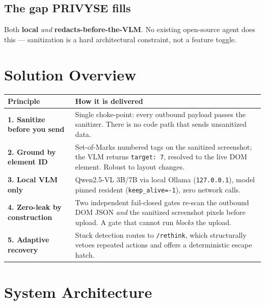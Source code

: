 \documentclass[11pt,a4paper]{article}
\newcommand{\code}[1]{\texttt{#1}}
\begin{document}
\begin{itemize}
\subsection*{The gap PRIVYSE fills}
Both \textbf{local} \emph{and} \textbf{redacts-before-the-VLM}. No existing open-source agent does this --- sanitization is a hard architectural constraint, not a feature toggle.

\section{Solution Overview}

\begin{center}
\begin{tabular}{@{}p{3.2cm}p{9.6cm}@{}}
\toprule
\textbf{Principle} & \textbf{How it is delivered} \\
\midrule
\textbf{1. Sanitize before you send} & Single choke-point: every outbound payload passes the sanitizer. There is no code path that sends unsanitized data. \\
\midrule
\textbf{2. Ground by element ID} & Set-of-Marks numbered tags on the sanitized screenshot; the VLM returns \code{target: 7}, resolved to the live DOM element. Robust to layout changes. \\
\midrule
\textbf{3. Local VLM only} & Qwen2.5-VL 3B/7B via local Ollama (\code{127.0.0.1}), model pinned resident (\code{keep\_alive=-1}), zero network calls. \\
\midrule
\textbf{4. Zero-leak by construction} & Two independent fail-closed gates re-scan the outbound DOM JSON \emph{and} the sanitized screenshot pixels before upload. A gate that cannot run \emph{blocks} the upload. \\
\midrule
\textbf{5. Adaptive recovery} & Stuck detection routes to \code{/rethink}, which structurally vetoes repeated actions and offers a deterministic escape hatch. \\
\bottomrule
\end{tabular}
\end{center}

\section{System Architecture}


\end{itemize}
\end{document}

